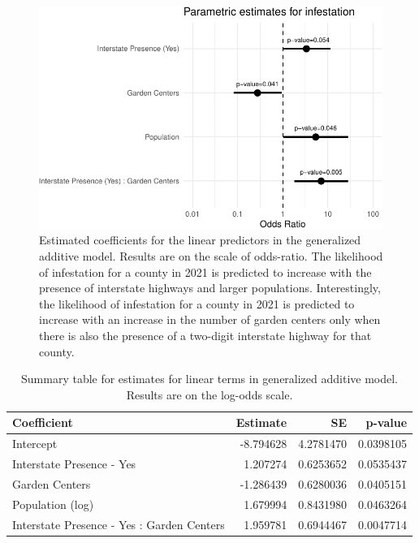 \documentclass[
  letterpaper,
  DIV=11,
  numbers=noendperiod]{scrartcl}
\begin{document}
\begin{figure}

{\centering \includegraphics{revisions_statistical_analysis_files/figure-pdf/fig-estimates-1.pdf}

}

\caption{\label{fig-estimates}Estimated coefficients for the linear
predictors in the generalized additive model. Results are on the scale
of odds-ratio. The likelihood of infestation for a county in 2021 is
predicted to increase with the presence of interstate highways and
larger populations. Interestingly, the likelihood of infestation for a
county in 2021 is predicted to increase with an increase in the number
of garden centers only when there is also the presence of a two-digit
interstate highway for that county.}

\end{figure}

\hypertarget{tbl-mod-summ}{}
\begin{table}
\caption{\label{tbl-mod-summ}Summary table for estimates for linear terms in generalized additive
model. Results are on the log-odds scale. }\tabularnewline

\centering
\begin{tabular}{l|r|r|r}
\hline
Coefficient & Estimate & SE & p-value\\
\hline
Intercept & -8.794628 & 4.2781470 & 0.0398105\\
\hline
Interstate Presence - Yes & 1.207274 & 0.6253652 & 0.0535437\\
\hline
Garden Centers & -1.286439 & 0.6280036 & 0.0405151\\
\hline
Population (log) & 1.679994 & 0.8431980 & 0.0463264\\
\hline
Interstate Presence - Yes : Garden Centers & 1.959781 & 0.6944467 & 0.0047714\\
\hline
\end{tabular}
\end{table}
\end{document}
